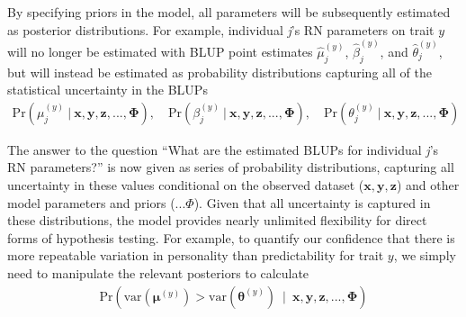 \documentclass{article}
\begin{document}
By specifying priors in the model, all parameters will be subsequently
estimated as posterior distributions. For example, individual \emph{j}'s
RN parameters on trait \(y\) will no longer be estimated with BLUP point
estimates \(\hat{\mu}_j^{(y)}\), \(\hat{\beta}_j^{(y)}\), and
\(\hat{\theta}_j^{(y)}\), but will instead be estimated as probability
distributions capturing all of the statistical uncertainty in the BLUPs
\begin{align} \tag{2.1}\label{eq:2.1}
\mathrm{Pr}\left( \mu_j^{(y)} \ | \ \boldsymbol{x},\boldsymbol{y},\boldsymbol{z},...,\boldsymbol{\Phi} \right), \quad
\mathrm{Pr}\left( \beta_j^{(y)} \ | \ \boldsymbol{x},\boldsymbol{y},\boldsymbol{z},...,\boldsymbol{\Phi} \right), \quad
\mathrm{Pr}\left( \theta_j^{(y)} \ | \ \boldsymbol{x},\boldsymbol{y},\boldsymbol{z},...,\boldsymbol{\Phi} \right)
\end{align}

The answer to the question ``What are the estimated BLUPs for individual
\emph{j}'s RN parameters?'' is now given as series of probability
distributions, capturing all uncertainty in these values conditional on
the observed dataset (\(\boldsymbol{x},\boldsymbol{y},\boldsymbol{z}\))
and other model parameters and priors (\(...\Phi\)). Given that all
uncertainty is captured in these distributions, the model provides
nearly unlimited flexibility for direct forms of hypothesis testing. For
example, to quantify our confidence that there is more repeatable
variation in personality than predictability for trait \(y\), we simply
need to manipulate the relevant posteriors to calculate
\begin{align} \tag{2.2}\label{eq:2.2}
\mathrm{Pr}\left( \mathrm{var} ( \boldsymbol{\mu}^{(y)} )  > \mathrm{var} ( \boldsymbol{\theta}^{(y)} )  \ \mid \ \boldsymbol{x},\boldsymbol{y},\boldsymbol{z},...,\boldsymbol{\Phi} \right)
\end{align}
\end{document}
